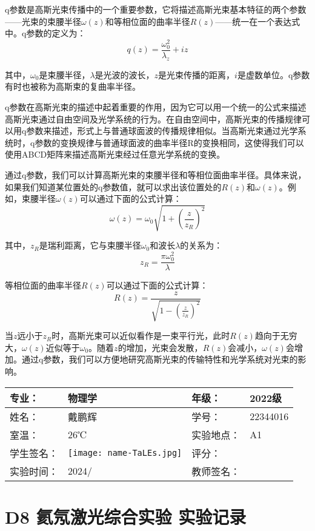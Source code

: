 \documentclass[dvipsnames, svgnames,a4paper,11pt]{article}
\begin{document}
	q参数是高斯光束传播中的一个重要参数，它将描述高斯光束基本特征的两个参数——光束的束腰半径$\omega(z)$和等相位面的曲率半径$R(z)$——统一在一个表达式中。q参数的定义为：
	\[
		q(z) = \frac{\omega_0^2}{\lambda_z} + i z
	\]
	
	其中，$\omega_0$是束腰半径，$\lambda$是光波的波长，$z$是光束传播的距离，$i$是虚数单位。q参数有时也被称为高斯束的复曲率半径。

	q参数在高斯光束的描述中起着重要的作用，因为它可以用一个统一的公式来描述高斯光束通过自由空间及光学系统的行为。在自由空间中，高斯光束的传播规律可以用q参数来描述，形式上与普通球面波的传播规律相似。当高斯光束通过光学系统时，q参数的变换规律与普通球面波的曲率半径R的变换相同，这使得我们可以使用ABCD矩阵来描述高斯光束经过任意光学系统的变换。

	通过q参数，我们可以计算高斯光束的束腰半径和等相位面曲率半径。具体来说，如果我们知道某位置处的q参数值，就可以求出该位置处的$R(z)$和$\omega(z)$。例如，束腰半径$\omega(z)$可以通过下面的公式计算：
	\[
		\omega(z) = \omega_0 \sqrt{1 + (\frac{z}{z_R})^2}
	\]

	其中，$z_R$是瑞利距离，它与束腰半径$\omega_0$和波长$\lambda$的关系为：
	\[
		z_R = \frac{\pi \omega_0^2}{\lambda}
	\]

	等相位面的曲率半径$R(z)$可以通过下面的公式计算：
	\[
		R(z) = \frac{z}{\sqrt{1 - (\frac{z}{z_R})^2}}
	\]

	当$z$远小于$z_R$时，高斯光束可以近似看作是一束平行光，此时$R(z)$趋向于无穷大，$\omega(z)$近似等于$\omega_0$。随着$z$的增加，光束会发散，$R(z)$会减小，$\omega(z)$会增加。通过q参数，我们可以方便地研究高斯光束的传输特性和光学系统对光束的影响。






\clearpage
\begin{table}
	\renewcommand\arraystretch{1.7}
	\centering
	\begin{tabularx}{\textwidth}{|X|X|X|X|}
	\hline
	专业：& 物理学 &年级：& 2022级 \\
	\hline
	姓名：& 戴鹏辉 & 学号：& 22344016 \\
	\hline
	室温：& 26℃ & 实验地点： & A1 \\
	\hline
	学生签名：& \texttt{[image: name-TaLEs.jpg]} & 评分： &\\
	\hline
	实验时间：& 2024/& 教师签名：&\\
	\hline
	\end{tabularx}
\end{table}

\section{D8 \quad 氦氖激光综合实验 \quad\heiti 实验记录}
\end{document}
